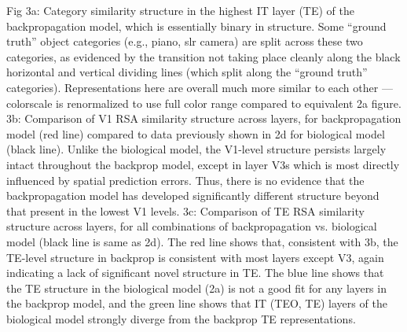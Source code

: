\documentclass[11pt,twoside]{article}
\newif\myifpdf
\begin{document}
Fig 3a: Category similarity structure in the highest IT layer (TE) of the backpropagation model, which is essentially binary in structure.  Some “ground truth” object categories (e.g., piano, slr camera) are split across these two categories, as evidenced by the transition not taking place cleanly along the black horizontal and vertical dividing lines (which split along the “ground truth” categories).  Representations here are overall much more similar to each other — colorscale is renormalized to use full color range compared to equivalent 2a figure.
3b: Comparison of V1 RSA similarity structure across layers, for backpropagation model (red line) compared to data previously shown in 2d for biological model (black line). Unlike the biological model, the V1-level structure persists largely intact throughout the backprop model, except in layer V3s which is most directly influenced by spatial prediction errors.  Thus, there is no evidence that the backpropagation model has developed significantly different structure beyond that present in the lowest V1 levels.
3c: Comparison of TE RSA similarity structure across layers, for all combinations of backpropagation vs. biological model (black line is same as 2d).  The red line shows that, consistent with 3b, the TE-level structure in backprop is consistent with most layers except V3, again indicating a lack of significant novel structure in TE.  The blue line shows that the TE structure in the biological model (2a) is not a good fit for any layers in the backprop model, and the green line shows that IT (TEO, TE) layers of the biological model strongly diverge from the backprop TE representations.
\end{document}
